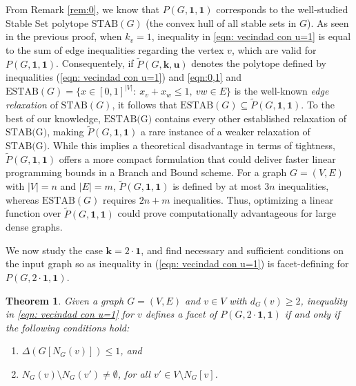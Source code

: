 \documentclass[preprint,12pt]{article}
\renewcommand{\leq}{\leqslant}
\renewcommand{\geq}{\geqslant}
\newtheorem{theorem}{Theorem}[section]
\theoremstyle{definition}
\begin{document}
From Remark \ref{rem:0}, we know that  $P(G, \mathbf{1}, \mathbf{1})$ corresponds to the well-studied Stable Set polytope $\text{STAB}(G)$ (the convex hull of all stable sets in $G$).
As seen in the previous proof, when $k_v=1$, inequality in \eqref{eqn: vecindad con u=1} is equal to the sum of edge inequalities regarding the vertex $v$, which are valid for $P(G,\mathbf{1},\mathbf{1})$. Consequentely,  if $ \tilde{P}(G,\mathbf{k},\mathbf{u}) $  denotes the polytope defined by inequalities (\ref{eqn: vecindad con u=1}) and \eqref{eqn:0,1} and $\text{ESTAB}(G)=\{x\in [0,1]^{|V|}:\ x_v+x_w\leq 1,\ vw\in E \}$ is the well-known \emph{edge relaxation} of $\text{STAB}(G)$, it follows that $\text{ESTAB}(G)\subseteq \tilde{P}(G,\mathbf{1},\mathbf{1})$.
To the best of our knowledge, $\text{ESTAB(G)}$ contains every other established relaxation of $\text{STAB(G)}$, making $\tilde{P}(G,\mathbf{1},\mathbf{1})$ a rare instance of a weaker relaxation of $\text{STAB(G)}$. While this implies a theoretical disadvantage in terms of tightness, $\tilde{P}(G,\mathbf{1},\mathbf{1})$
offers a more compact formulation that could deliver faster linear programming bounds in a Branch and Bound scheme.
For a graph $G=(V,E)$ with $|V|=n$ and $|E|=m$, $\tilde{P}(G,\mathbf{1},\mathbf{1})$ is defined by at most $3n$ inequalities, whereas $\text{ESTAB}(G)$ requires $2n+m$ inequalities. Thus, optimizing a linear function over $\tilde{P}(G,\mathbf{1},\mathbf{1})$ could prove computationally advantageous for large dense graphs.

\bigskip


We now study the case $\mathbf{k}=2\cdot \mathbf{1}$, and find  necessary and sufficient conditions on the input graph so as inequality in (\ref{eqn: vecindad con u=1})  is facet-defining for $P(G,2\cdot \mathbf{1},\mathbf{1})$.


\begin{theorem}\label{th:4.7}
    Given a graph $G=(V,E)$ and  $v\in V$ with $d_G(v)\geq 2$, inequality in \eqref{eqn: vecindad con u=1} for $v$ defines a facet of $P(G,2\cdot\mathbf{1},\mathbf{1})$ if and only if the following conditions hold:
    \begin{enumerate}
        \item[i.] $\Delta(G[N_G(v)])\leq 1$, and
        \item[ii.] $N_G(v)\setminus N_G(v')\neq \emptyset$, for all $v'\in V\setminus N_G[v]$.
    \end{enumerate}
    
     
\end{theorem}
\end{document}

